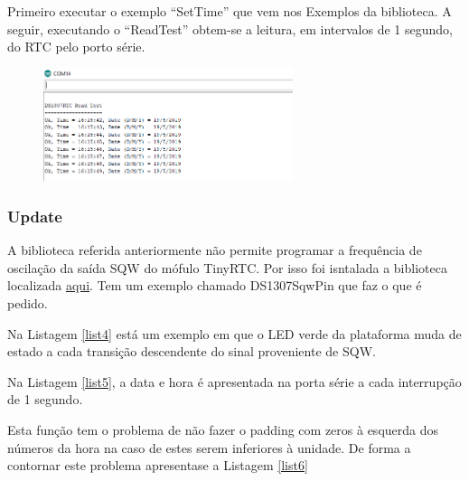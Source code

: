 \documentclass{article}
\begin{document}
Primeiro executar o exemplo ``SetTime'' que vem nos Exemplos da biblioteca. A seguir, executando o ``ReadTest'' obtem-se a leitura, em intervalos de 1 segundo, do RTC pelo porto série.

\begin{figure}[htb!]
\centering
\includegraphics[width=0.65\textwidth]{Figuras/Fig22.png}
\label{fig:fig15}
\end{figure}

\subsubsection{Update}
A biblioteca referida anteriormente não permite programar a frequência de oscilação da saída SQW do mófulo TinyRTC. Por isso foi isntalada a biblioteca localizada \href{https://github.com/adafruit/RTClib/tree/e03a97139e285eeb4a5a3c052ab421f53a88031c}{aqui}. Tem um exemplo chamado DS1307SqwPin que faz o que é pedido. 

Na Listagem \ref{list4} está um exemplo em que o LED verde da plataforma muda de estado a cada transição descendente do sinal proveniente de SQW.



Na Listagem \ref{list5}, a data e hora é apresentada na porta série a cada interrupção de 1 segundo.



Esta função tem o problema de não fazer o padding com zeros à esquerda dos números da hora na caso de estes serem inferiores à unidade. De forma a contornar este problema apresentase a Listagem \ref{list6}


\end{document}
